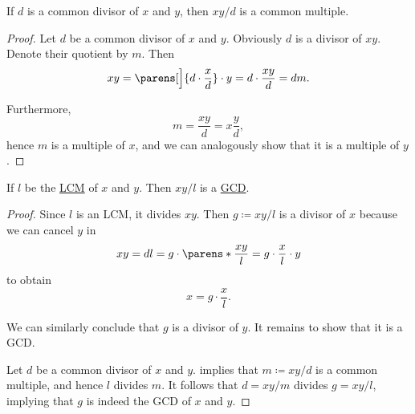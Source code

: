 \begin{lemma}\label{thm:common_divisor_to_multiple_lemma}
  If \( d \) is a common divisor of \( x \) and \( y \), then \( xy / d \) is a common multiple.
\end{lemma}
\begin{proof}
  Let \( d \) be a common divisor of \( x \) and \( y \). Obviously \( d \) is a divisor of \( xy \). Denote their quotient by \( m \). Then
  \begin{equation*}
    xy = \parens[\Big]{ d \cdot \frac x d } \cdot y = d \cdot \frac {xy} d = dm.
  \end{equation*}

  Furthermore,
  \begin{equation*}
    m = \frac {xy} d = x \frac y d,
  \end{equation*}
  hence \( m \) is a multiple of \( x \), and we can analogously show that it is a multiple of \( y \).
\end{proof}

\begin{lemma}\label{thm:lcm_to_gcd_lemma}
  If \( l \) be the \hyperref[def:least_common_divisor]{LCM} of \( x \) and \( y \). Then \( xy / l \) is a \hyperref[def:greatest_common_divisor]{GCD}.
\end{lemma}
\begin{proof}
  Since \( l \) is an LCM, it divides \( xy \). Then \( g \coloneqq xy / l \) is a divisor of \( x \) because we can cancel \( y \) in
  \begin{equation*}
    xy = dl = g \cdot \parens*{ \frac {xy} l } = g \cdot \frac x l \cdot y
  \end{equation*}
  to obtain
  \begin{equation*}
    x = g \cdot \frac x l.
  \end{equation*}

  We can similarly conclude that \( g \) is a divisor of \( y \). It remains to show that it is a GCD.

  Let \( d \) be a common divisor of \( x \) and \( y \).  implies that \( m \coloneqq xy / d \) is a common multiple, and hence \( l \) divides \( m \). It follows that \( d = xy / m \) divides \( g = xy / l \), implying that \( g \) is indeed the GCD of \( x \) and \( y \).
\end{proof}


